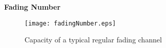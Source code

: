 \documentclass[landscape,dvips,a4]{seminar}
\begin{document}
\begin{slide}
  \begin{center}
    \textbf{\Large Fading Number}
  \end{center}
 \vspace{3mm}
 \begin{figure}[htbp]
    \centering
 \texttt{[image: fadingNumber.eps]}
    \caption{Capacity of a typical regular fading channel}
    \label{fig:fadingNumber}
  \end{figure}
\end{slide}
\end{document}
